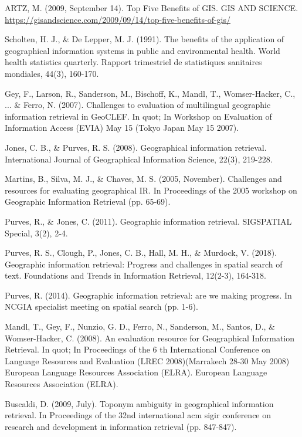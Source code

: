 \documentclass{llncs}
\begin{document}
\begin{thebibliography}{}
ARTZ, M. (2009, September 14). Top Five Benefits of GIS. GIS AND SCIENCE.
\url{https://gisandscience.com/2009/09/14/top-five-benefits-of-gis/}

Scholten, H. J., \& De Lepper, M. J. (1991). The benefits of the application of
geographical information systems in public and environmental health. World
health statistics quarterly. Rapport trimestriel de statistiques sanitaires
mondiales, 44(3), 160-170.

Gey, F., Larson, R., Sanderson, M., Bischoff, K., Mandl, T., Womser-Hacker, C.,
... \& Ferro, N. (2007). Challenges to evaluation of multilingual geographic
information retrieval in GeoCLEF. In quot; In Workshop on Evaluation of
Information Access (EVIA) May 15 (Tokyo Japan May 15 2007).

Jones, C. B., \& Purves, R. S. (2008). Geographical information retrieval.
International Journal of Geographical Information Science, 22(3), 219-228.

Martins, B., Silva, M. J., \& Chaves, M. S. (2005, November). Challenges and
resources for evaluating geographical IR. In Proceedings of the 2005 workshop
on Geographic Information Retrieval (pp. 65-69).

Purves, R., \& Jones, C. (2011). Geographic information retrieval. SIGSPATIAL
Special, 3(2), 2-4.

Purves, R. S., Clough, P., Jones, C. B., Hall, M. H., \& Murdock, V. (2018).
Geographic information retrieval: Progress and challenges in spatial search of
text. Foundations and Trends in Information Retrieval, 12(2-3), 164-318.

Purves, R. (2014). Geographic information retrieval: are we making progress. In
NCGIA specialist meeting on spatial search (pp. 1-6).

Mandl, T., Gey, F., Nunzio, G. D., Ferro, N., Sanderson, M., Santos, D., \&
Womser-Hacker, C. (2008). An evaluation resource for Geographical Information
Retrieval. In quot; In Proceedings of the 6 th International Conference on
Language Resources and Evaluation (LREC 2008)(Marrakech 28-30 May 2008)
European Language Resources Association (ELRA). European Language Resources
Association (ELRA).

Buscaldi, D. (2009, July). Toponym ambiguity in geographical information
retrieval. In Proceedings of the 32nd international acm sigir conference on
research and development in information retrieval (pp. 847-847).


\end{thebibliography}
\end{document}

